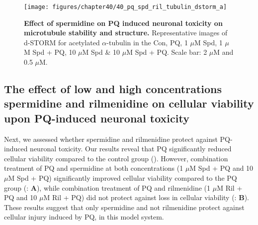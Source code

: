 \begin{landscape}
\begin{figure}[!htbp]
\center
  \texttt{[image: figures/chapter40/40\_pq\_spd\_ril\_tubulin\_dstorm\_a]}
  \caption[Effect of spermidine on PQ induced neuronal toxicity on microtubule stability and structure]{\textbf{Effect of spermidine on PQ induced neuronal toxicity on microtubule stability and structure.} Representative images of d-STORM for acetylated $\alpha$-tubulin in the Con, PQ, 1 $\mu$M Spd, 1 $\mu$M Spd + PQ, 10 $\mu$M Spd \& 10 $\mu$M Spd + PQ. Scale bar: 2 $\mu$M and 0.5 $\mu$M.}
  \label{fig:40_pq_spd_ril_tubulin_dstorm_a}
\end{figure} 
\end{landscape}

\subsection{The effect of low and high concentrations spermidine and rilmenidine on cellular viability upon PQ-induced neuronal toxicity} 
Next, we assessed whether spermidine and rilmenidine protect against PQ-induced neuronal toxicity. Our results reveal that PQ significantly reduced cellular viability compared to the control group (). However, combination treatment of PQ and spermidine at both concentrations (1 $\mu$M Spd + PQ and 10 $\mu$M Spd + PQ) significantly improved cellular viability compared to the PQ group (: \textbf{A}), while combination treatment of PQ and rilmenidine (1 $\mu$M Ril + PQ and 10 $\mu$M Ril + PQ) did not protect against loss in cellular viability (: \textbf{B}). These results suggest that only spermidine and not rilmenidine protect against cellular injury induced by PQ, in this model system.

